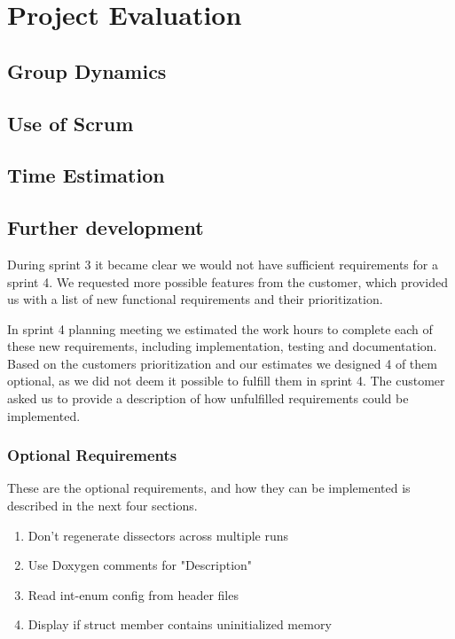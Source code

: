\chapter{Project Evaluation}

\section{Group Dynamics}

\section{Use of Scrum}

\section{Time Estimation}


\section{Further development}
During sprint 3 it became clear we would not have sufficient requirements for a sprint 4. We requested more possible features from the customer, which provided us with a list of new functional requirements and their prioritization.

In sprint 4 planning meeting we estimated the work hours to complete each of these new requirements, including implementation, testing and documentation. Based on the customers prioritization and our estimates we designed 4 of them optional, as we did not deem it possible to fulfill them in sprint 4. The customer asked us to provide a description of how unfulfilled requirements could be implemented.

\subsection{Optional Requirements}
These are the optional requirements, and how they can be implemented is described in the next four sections.
\begin{enumerate}
\item Don't regenerate dissectors across multiple runs
\item Use Doxygen comments for "Description"	
\item Read int-enum config from header files
\item Display if struct member contains uninitialized memory
\end {enumerate} 

